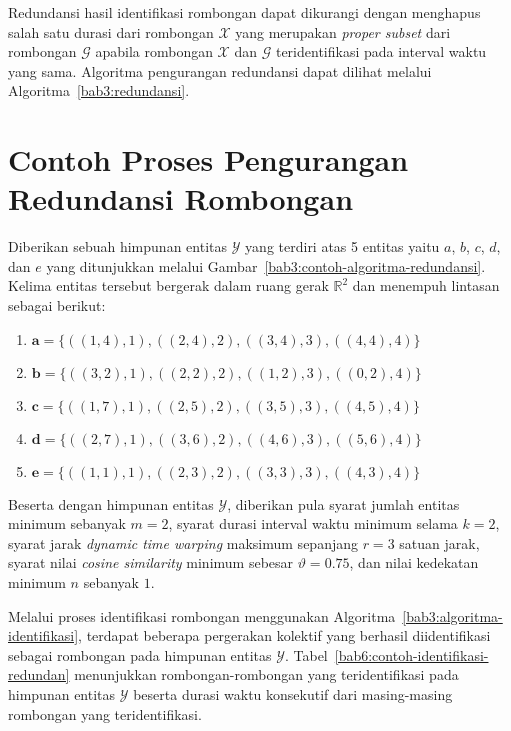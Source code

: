 Redundansi hasil identifikasi rombongan dapat dikurangi dengan menghapus salah satu durasi dari rombongan $\mathcal{X}$ yang merupakan \textit{proper subset} dari rombongan $\mathcal{G}$ apabila rombongan $\mathcal{X}$ dan $\mathcal{G}$ teridentifikasi pada interval waktu yang sama. Algoritma pengurangan redundansi dapat dilihat melalui Algoritma~\ref{bab3:redundansi}.

\section{Contoh Proses Pengurangan Redundansi Rombongan}
\label{sec:redundancy-example}

Diberikan sebuah himpunan entitas $\mathcal{Y}$ yang terdiri atas 5 entitas yaitu $a$, $b$, $c$, $d$, dan $e$ yang ditunjukkan melalui Gambar~\ref{bab3:contoh-algoritma-redundansi}. Kelima entitas tersebut bergerak dalam ruang gerak $\mathbb{R}^2$ dan menempuh lintasan sebagai berikut:

\begin{enumerate}
    \item $\textbf{a} = \{ ((1, 4), 1), ((2, 4), 2), ((3, 4), 3), ((4, 4), 4) \}$
    \item $\textbf{b} = \{ ((3, 2), 1), ((2, 2), 2), ((1, 2), 3), ((0, 2), 4) \}$
    \item $\textbf{c} = \{ ((1, 7), 1), ((2, 5), 2), ((3, 5), 3), ((4, 5), 4) \}$
    \item $\textbf{d} = \{ ((2, 7), 1), ((3, 6), 2), ((4, 6), 3), ((5, 6), 4) \}$
    \item $\textbf{e} = \{ ((1, 1), 1), ((2, 3), 2), ((3, 3), 3), ((4, 3), 4) \}$
\end{enumerate}

Beserta dengan himpunan entitas $\mathcal{Y}$, diberikan pula syarat jumlah entitas minimum sebanyak $m = 2$, syarat durasi interval waktu minimum selama $k = 2$, syarat jarak \textit{dynamic time warping} maksimum sepanjang $r = 3$ satuan jarak, syarat nilai \textit{cosine similarity} minimum sebesar $\vartheta = 0.75$, dan nilai kedekatan minimum $n$ sebanyak $1$.

Melalui proses identifikasi rombongan menggunakan Algoritma~\ref{bab3:algoritma-identifikasi}, terdapat beberapa pergerakan kolektif yang berhasil diidentifikasi sebagai rombongan pada himpunan entitas $\mathcal{Y}$. Tabel~\ref{bab6:contoh-identifikasi-redundan} menunjukkan rombongan-rombongan yang teridentifikasi pada himpunan entitas $\mathcal{Y}$ beserta durasi waktu konsekutif dari masing-masing rombongan yang teridentifikasi.

